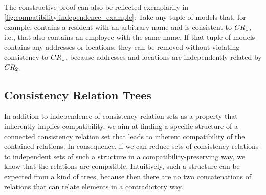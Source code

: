 The constructive proof can also be reflected exemplarily in \autoref{fig:compatibility:independence_example}: Take any tuple of models that, for example, contains a resident with an arbitrary name and is consistent to $\consistencyrelation{CR}{1}$, i.e., that also contains an employee with the same name.
If that tuple of models contains any addresses or locations, they can be removed %
without violating consistency to $\consistencyrelation{CR}{1}$, because addresses and locations are independently related by $\consistencyrelation{CR}{2}$.



\subsection{Consistency Relation Trees}

In addition to independence of consistency relation sets as a property that inherently implies compatibility, we aim at finding a specific structure of a connected consistency relation set that leads to inherent compatibility of the contained relations.
In consequence, if we can reduce sets of consistency relations to independent sets of such a structure in a compatibility-preserving way, we know that the relations are compatible.
Intuitively, such a structure can be expected from a kind of trees, because then there are no two concatenations of relations that can relate elements in a contradictory way.


